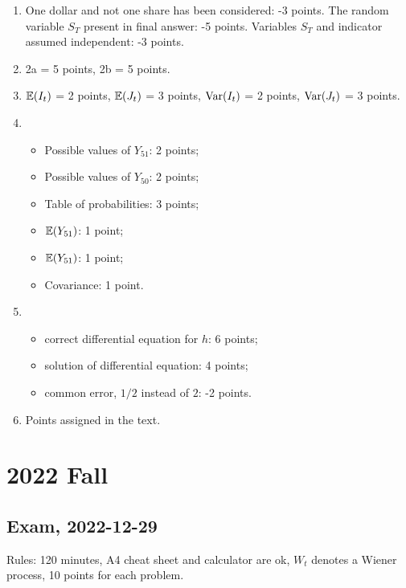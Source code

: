 \documentclass[12pt, a4paper]{article}
\begin{document}
\begin{enumerate}
  \item One dollar and not one share has been considered: -3 points. 
  The random variable $S_T$ present in final answer: -5 points. 
  Variables $S_T$ and indicator assumed independent: -3 points. 

  \item 2a = 5 points, 2b = 5 points.

  \item $\mathbb{E}(I_t)$ = 2 points, $\mathbb{E}(J_t)$ = 3 points,  $\operatorname{Var}(I_t)$ = 2 points, $\operatorname{Var}(J_t)$ = 3 points.
  
  \item 
  \begin{itemize}
    \item Possible values of $Y_{51}$: 2 points;
  \item Possible values of $Y_{50}$: 2 points; 
  \item Table of probabilities: 3 points; 
  \item $\mathbb{E}(Y_{51})$: 1 point; 
  \item $\mathbb{E}(Y_{51})$: 1 point; 
  \item Covariance: 1 point.
  \end{itemize}
  
  
  \item 
  \begin{itemize}
    \item correct differential equation for $h$: 6 points;
    \item solution of differential equation: 4 points;
    \item common error, $1/2$ instead of $2$: -2 points. 
  \end{itemize}
  
  \item Points assigned in the text. 
  
\end{enumerate}

\section{2022 Fall}

\subsection{Exam, 2022-12-29}

Rules: 120 minutes, A4 cheat sheet and calculator are ok, $W_t$ denotes a Wiener process,
10 points for each problem.
\end{document}

